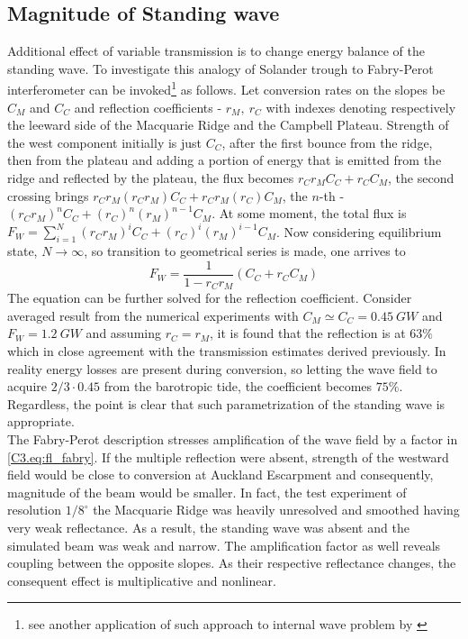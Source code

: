 \documentclass[12pt]{article}
\begin{document}
\subsection{Magnitude of Standing wave}
\label{C3.sec:disc_sw}
Additional effect of variable transmission is to change energy balance of the standing wave. To 
investigate this analogy of Solander trough to Fabry-Perot interferometer can be 
invoked\footnote{see another application of such approach to internal wave problem by 
	\cite{mathur2010internal}} as follows. Let conversion rates on the slopes be 
$C_M$ and $C_C$ and reflection coefficients - $r_M,~r_C$ with indexes denoting respectively the 
leeward 
side of the Macquarie Ridge and the Campbell Plateau. Strength of the west component initially is 
just $C_C$, after the first bounce from the ridge, then from the plateau and adding a portion of 
energy that is emitted from the ridge and reflected by the plateau, the flux becomes $r_C r_M C_C 
+ r_C C_M$, the second crossing brings $r_C r_M (r_C r_M) C_C + r_C r_M (r_C) C_M$, the $n$-th 
- $(r_C r_M)^n C_C + (r_C)^n (r_M)^{n-1} C_M$. At some moment, the total flux is $F_W = 
\sum_{i = 1}^N (r_C r_M)^i C_C + (r_C)^i (r_M)^{i-1} C_M$. Now considering equilibrium state, $N 
\rightarrow \infty$, so transition to geometrical series is made, one arrives to
\begin{equation}
\label{C3.eq:fl_fabry}
F_W = \frac{1}{1 - r_C r_M} (C_C + r_C C_M)
\end{equation}
The equation can be further solved for the reflection coefficient. Consider averaged result 
from the numerical experiments  with $C_M \simeq C_C = 0.45~GW$ and 
$F_W = 1.2~GW$ and assuming $r_C = r_M$, it is found that the reflection is at $63\%$ which in 
close agreement with the transmission estimates derived previously. In reality energy losses are 
present during conversion, so letting the wave field to acquire $2/3 \cdot 0.45$ 
from the barotropic tide, the coefficient becomes $75\%$. Regardless, the point is 
clear that such parametrization of the standing wave is appropriate.\\

The Fabry-Perot description stresses amplification of the wave field by a factor in 
\eqref{C3.eq:fl_fabry}. If the multiple reflection were absent, strength of the westward field 
would be    
close to conversion at Auckland Escarpment and consequently, magnitude of the beam would be 
smaller. In fact, 
the test experiment of resolution $1/8^{\circ}$ the Macquarie Ridge was heavily unresolved and 
smoothed having very weak reflectance. As a result, the standing wave was absent and the simulated 
beam was weak and narrow. The amplification factor as well reveals coupling between the opposite 
slopes. As their respective reflectance changes, the consequent effect is multiplicative and 
nonlinear.\\
\end{document}

